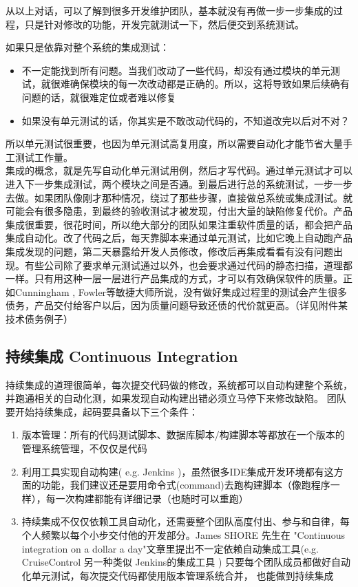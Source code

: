 从以上对话，可以了解到很多开发维护团队，基本就没有再做一步一步集成的过程，只是针对修改的功能，开发完就测试一下，然后便交到系统测试。

如果只是依靠对整个系统的集成测试：

\begin{itemize}
\tightlist
\item
  不一定能找到所有问题。当我们改动了一些代码，却没有通过模块的单元测试，就很难确保模块的每一次改动都是正确的。所以，这将导致如果后续确有问题的话，就很难定位或者难以修复
\item
  如果没有单元测试的话，你其实是不敢改动代码的，不知道改完以后对不对？
\end{itemize}

所以单元测试很重要，也因为单元测试高复用度，所以需要自动化才能节省大量手工测试工作量。\\
集成的概念，就是先写自动化单元测试用例，然后才写代码。通过单元测试才可以进入下一步集成测试，两个模块之间是否通。到最后进行总的系统测试，一步一步去做。如果团队像刚才那种情况，绕过了那些步骤，直接做总系统或集成测试。就可能会有很多隐患，到最终的验收测试才被发现，付出大量的缺陷修复代价。产品集成很重要，很花时间，所以绝大部分的团队如果注重软件质量的话，都会把产品集成自动化。改了代码之后，每天靠脚本来通过单元测试，比如它晚上自动跑产品集成发现的问题，第二天暴露给开发人员修改，修改后再集成看看有没有问题出现。有些公司除了要求单元测试通过以外，也会要求通过代码的静态扫描，道理都一样。只有用这种一层一层进行产品集成的方式，才可以有效确保软件的质量。正如Cunningham , Fowler等敏捷大师所说，没有做好集成过程里的测试会产生很多债务，产品交付给客户以后，因为质量问题导致还债的代价就更高。（详见附件某技术债务例子）

\hypertarget{ux6301ux7eedux96c6ux6210-continuous-integration}{%
\subsection{持续集成 Continuous
Integration}\label{ux6301ux7eedux96c6ux6210-continuous-integration}}

持续集成的道理很简单，每次提交代码做的修改，系统都可以自动构建整个系统，并跑通相关的自动化测，如果发现自动构建出错必须立马停下来修改缺陷。
团队要开始持续集成，起码要具备以下三个条件：

\begin{enumerate}
\tightlist
\item
  版本管理：所有的代码测试脚本、数据库脚本/构建脚本等都放在一个版本的管理系统管理，不仅仅是代码
\item
  利用工具实现自动构建( e.g. Jenkins
  )，虽然很多IDE集成开发环境都有这方面的功能，我们建议还是要用命令式(command)去跑构建脚本（像跑程序一样），每一次构建都能有详细记录（也随时可以重跑）
\item
  持续集成不仅仅依赖工具自动化，还需要整个团队高度付出、参与和自律，每个人频繁以每个小步交付他的开发部分。James
  SHORE 先生在 "Continuous integration on a dollar a
  day"文章里提出不一定依赖自动集成工具(e.g. CruiseControl 另一种类似
  Jenkins的集成工具 )
  只要每个团队成员都做好自动化单元测试，每次提交代码都使用版本管理系统合并，
  也能做到持续集成
\end{enumerate}

